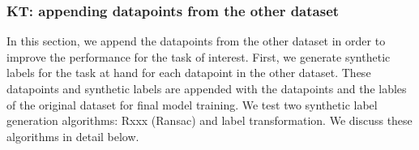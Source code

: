 \documentclass{article}
\begin{document}
\subsubsection{KT: appending datapoints from the other dataset}

In this section, we append the datapoints from the other dataset in order to improve the performance for the task of interest.
First, we generate synthetic labels for the task at hand for each datapoint in the other dataset.
These datapoints and synthetic labels are appended with the datapoints and the lables of the original dataset for final model training.
We test two synthetic label generation algorithms: Rxxx (Ransac) and label transformation.
We discuss these algorithms in detail below.
\\
\end{document}
